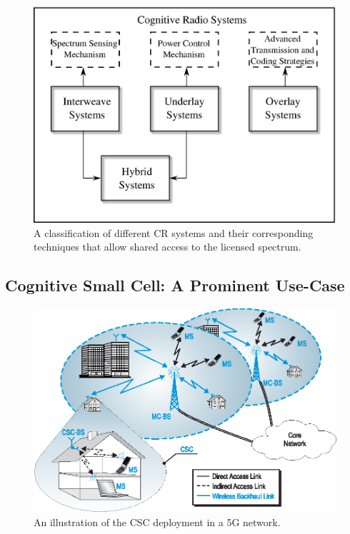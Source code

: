 \begin{figure}
\centering
\includegraphics[width = 0.85 \columnwidth]{figures/CR_paradigm}
\caption{A classification of different CR systems and their corresponding techniques that allow shared access to the licensed spectrum.}
\label{fig_Int:paradigm}
\end{figure}



\subsection{Cognitive Small Cell: A Prominent Use-Case}
\begin{figure}
\centering
\includegraphics[width = 0.9 \columnwidth]{figures/Cellular_Scenario_CR6F}
\caption{An illustration of the CSC deployment in a 5G network.}
\label{fig_Int:archi}
\end{figure}



